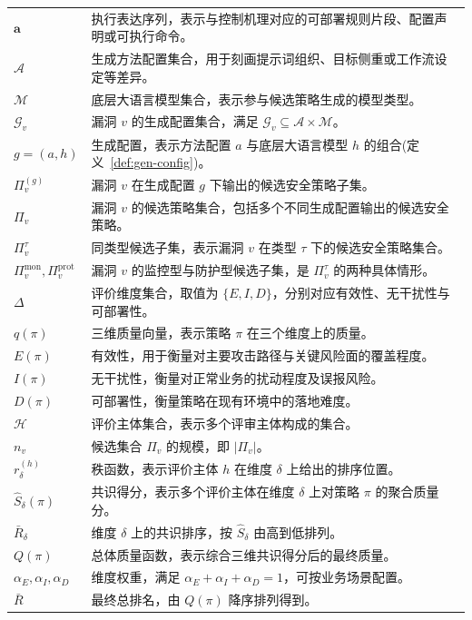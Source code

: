 \begin{longtable}{>{\centering\arraybackslash}p{2.9cm} >{\raggedright\arraybackslash}p{10.5cm}}
$\mathbf{a}$ & 执行表达序列，表示与控制机理对应的可部署规则片段、配置声明或可执行命令。 \\
$\mathcal{A}$ & 生成方法配置集合，用于刻画提示词组织、目标侧重或工作流设定等差异。 \\
$\mathcal{M}$ & 底层大语言模型集合，表示参与候选策略生成的模型类型。 \\
$\mathcal{G}_v$ & 漏洞 $v$ 的生成配置集合，满足 $\mathcal{G}_v\subseteq\mathcal{A}\times\mathcal{M}$。 \\
$g=(a,h)$ & 生成配置，表示方法配置 $a$ 与底层大语言模型 $h$ 的组合(定义~\ref{def:gen-config})。 \\
$\Pi_v^{(g)}$ & 漏洞 $v$ 在生成配置 $g$ 下输出的候选安全策略子集。 \\
$\Pi_v$ & 漏洞 $v$ 的候选策略集合，包括多个不同生成配置输出的候选安全策略。 \\
$\Pi_v^{\tau}$ & 同类型候选子集，表示漏洞 $v$ 在类型 $\tau$ 下的候选安全策略集合。 \\
$\Pi_v^{\mathrm{mon}},\Pi_v^{\mathrm{prot}}$ & 漏洞 $v$ 的监控型与防护型候选子集，是 $\Pi_v^{\tau}$ 的两种具体情形。 \\[0.4ex]
$\Delta$ & 评价维度集合，取值为 $\{E,I,D\}$，分别对应有效性、无干扰性与可部署性。 \\
$q(\pi)$ & 三维质量向量，表示策略 $\pi$ 在三个维度上的质量。 \\
$E(\pi)$ & 有效性，用于衡量对主要攻击路径与关键风险面的覆盖程度。 \\
$I(\pi)$ & 无干扰性，衡量对正常业务的扰动程度及误报风险。 \\
$D(\pi)$ & 可部署性，衡量策略在现有环境中的落地难度。 \\
$\mathcal{H}$ & 评价主体集合，表示多个评审主体构成的集合。 \\
$n_v$ & 候选集合 $\Pi_v$ 的规模，即 $|\Pi_v|$。 \\
$r_{\delta}^{(h)}$ & 秩函数，表示评价主体 $h$ 在维度 $\delta$ 上给出的排序位置。 \\
$\hat S_{\delta}(\pi)$ & 共识得分，表示多个评价主体在维度 $\delta$ 上对策略 $\pi$ 的聚合质量分。 \\
$\bar R_{\delta}$ & 维度 $\delta$ 上的共识排序，按 $\hat S_{\delta}$ 由高到低排列。 \\
$Q(\pi)$ & 总体质量函数，表示综合三维共识得分后的最终质量。 \\
$\alpha_E,\alpha_I,\alpha_D$ & 维度权重，满足 $\alpha_E+\alpha_I+\alpha_D=1$，可按业务场景配置。 \\
$\bar R$ & 最终总排名，由 $Q(\pi)$ 降序排列得到。 \\
\end{longtable}
\endgroup

